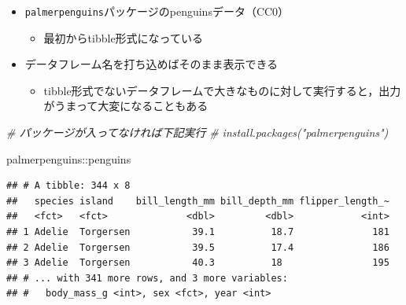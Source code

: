 \documentclass[
  xelatex,ja=standard, b5paper]{bxjsbook}
\newenvironment{Shaded}{\begin{snugshade}}{\end{snugshade}}
\newcommand{\CommentTok}[1]{\textcolor[rgb]{0.56,0.35,0.01}{\textit{#1}}}
\newcommand{\NormalTok}[1]{#1}
\newcommand{\SpecialCharTok}[1]{\textcolor[rgb]{0.00,0.00,0.00}{#1}}
\providecommand{\tightlist}{%
  \setlength{\itemsep}{0pt}\setlength{\parskip}{0pt}}
\begin{document}
\begin{itemize}
\tightlist
\item
  \texttt{palmerpenguins}パッケージのpenguinsデータ（CC0）

  \begin{itemize}
  \tightlist
  \item
    最初からtibble形式になっている
  \end{itemize}
\item
  データフレーム名を打ち込めばそのまま表示できる

  \begin{itemize}
  \tightlist
  \item
    tibble形式でないデータフレームで大きなものに対して実行すると，出力がうまって大変になることもある
  \end{itemize}
\end{itemize}

\begin{Shaded}
\begin{Highlighting}[]
\CommentTok{\# パッケージが入ってなければ下記実行}
\CommentTok{\# install.packages("palmerpenguins")}

\NormalTok{palmerpenguins}\SpecialCharTok{::}\NormalTok{penguins}
\end{Highlighting}
\end{Shaded}

\begin{verbatim}
## # A tibble: 344 x 8
##   species island    bill_length_mm bill_depth_mm flipper_length_~
##   <fct>   <fct>              <dbl>         <dbl>            <int>
## 1 Adelie  Torgersen           39.1          18.7              181
## 2 Adelie  Torgersen           39.5          17.4              186
## 3 Adelie  Torgersen           40.3          18                195
## # ... with 341 more rows, and 3 more variables:
## #   body_mass_g <int>, sex <fct>, year <int>
\end{verbatim}
\end{document}

